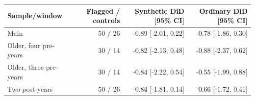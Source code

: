 \begin{tabular}{lrrr}
\toprule
Sample/window & Flagged / controls & Synthetic DiD [95\% CI] & Ordinary DiD [95\% CI] \\
\midrule
Main & 50 / 26 & -0.89 [-2.01, 0.22] & -0.78 [-1.86, 0.30] \\
Older, four pre-years & 30 / 14 & -0.82 [-2.13, 0.48] & -0.88 [-2.37, 0.62] \\
Older, three pre-years & 30 / 14 & -0.84 [-2.22, 0.54] & -0.55 [-1.99, 0.88] \\
Two post-years & 50 / 26 & -0.84 [-1.81, 0.14] & -0.66 [-1.72, 0.41] \\
\bottomrule
\end{tabular}
